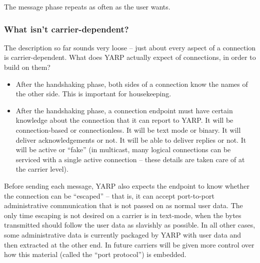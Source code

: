 The message phase repeats as often as the user wants.


\subsubsection*{What isn't carrier-dependent?}

The description so far sounds very loose -- just about every aspect
of a connection is carrier-dependent.  What does YARP actually
expect of connections, in order to build on them?

\begin{itemize}

\item After the handshaking phase, both sides of a connection know the
names of the other side.  This is important for housekeeping.

\item After the handshaking phase, a connection endpoint must have
certain knowledge about the connection that it can report to YARP.  It
will be connection-based or connectionless.  It will be text mode or
binary.  It will deliver acknowledgements or not.  It will be able to
deliver replies or not.  It will be active or ``fake'' (in multicast,
many logical connections can be serviced with a single active
connection -- these details are taken care of at the carrier level).

\end{itemize}

Before sending each message, YARP also expects the endpoint to know
whether the connection can be ``escaped'' -- that is, it can accept
port-to-port administrative communication that is not passed on as
normal user data.  The only time escaping is not desired on a carrier
is in text-mode, when the bytes transmitted should follow the user
data as slavishly as possible.  In all other cases, some
administrative data is currently packaged by YARP with user data and
then extracted at the other end.  In future carriers will be given
more control over how this material (called the ``port protocol'') is
embedded.


